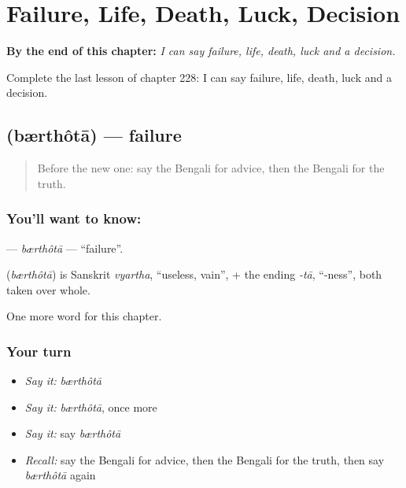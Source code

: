 
\chapter{Failure, Life, Death, Luck, Decision}
\label{ch:bn-failure-life-death-luck-decision}

\begin{chapteropening}
\textbf{By the end of this chapter:} \emph{I can say failure, life, death, luck and a decision.}

Complete the last lesson of chapter 228: I can say failure, life, death, luck and a decision.
\end{chapteropening}

\section[\texorpdfstring{\bn{ব্যর্থতা} (bærthôtā)}{ব্যর্থতা (bærthôtā)}]{ (bærthôtā) — failure}

\label{lesson:BN-C228-brthota}



\begin{quote}
Before the new one: say the Bengali for advice, then the Bengali for the truth.
\end{quote}

\subsection*{You'll want to know: }
\textbf{} — \emph{bærthôtā} — \textquotedblleft{}failure\textquotedblright{}.

\begin{cousinweb}
\textbf{} (\emph{bærthôtā}) is Sanskrit \emph{vyartha}, \textquotedblleft{}useless, vain\textquotedblright{}, + the ending \emph{-tā}, \textquotedblleft{}-ness\textquotedblright{}, both taken over whole.
\end{cousinweb}

\begin{grammarlens}[title={What you've built}]
One more word for this chapter.
\end{grammarlens}

\subsection*{Your turn}
\begin{itemize}
\raggedright
  \item \emph{Say it:} \emph{bærthôtā}
  \item \emph{Say it:} \emph{bærthôtā}, once more
  \item \emph{Say it:} say \emph{bærthôtā}
  \item \emph{Recall:} say the Bengali for advice, then the Bengali for the truth, then say \emph{bærthôtā} again
\end{itemize}

